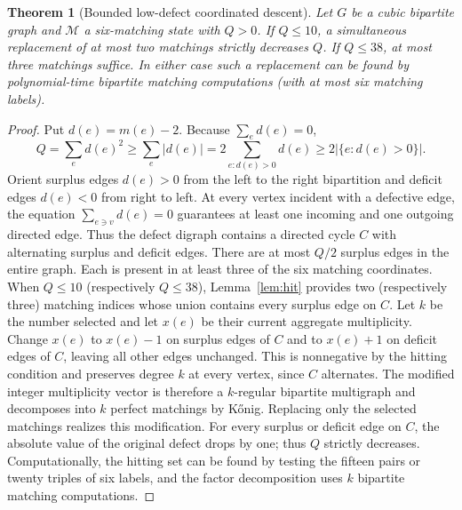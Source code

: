 \documentclass[11pt]{article}
\newtheorem{theorem}{Theorem}[section]
\begin{document}
\begin{theorem}[Bounded low-defect coordinated descent]\label{thm:range}
Let $G$ be a cubic bipartite graph and $\mathcal M$ a
six-matching state with $Q>0$. If $Q\le10$, a simultaneous
replacement of at most two matchings strictly decreases $Q$.
If $Q\le38$, at most three matchings suffice. In either case
such a replacement can be found by polynomial-time bipartite
matching computations (with at most six matching labels).
\end{theorem}
\begin{proof}
Put $d(e)=m(e)-2$. Because $\sum_e d(e)=0$,
\[
 Q=\sum_ed(e)^2\ge\sum_e|d(e)|
   =2\sum_{e:d(e)>0}d(e)
   \ge2|\{e:d(e)>0\}|.
\]
Orient surplus edges $d(e)>0$ from the left to the right
bipartition and deficit edges $d(e)<0$ from right to left.
At every vertex incident with a defective edge, the equation
$\sum_{e\ni v}d(e)=0$ guarantees at least one incoming
and one outgoing directed edge. Thus the defect digraph
contains a directed cycle $C$ with alternating surplus and
deficit edges. There are at most $Q/2$ surplus edges in the
entire graph. Each is present in at least three of the six
matching coordinates. When $Q\le10$ (respectively $Q\le38$),
Lemma~\ref{lem:hit} provides two (respectively three) matching
indices whose union contains every surplus edge on $C$.
Let $k$ be the number selected and let $x(e)$ be their current
aggregate multiplicity. Change $x(e)$ to $x(e)-1$ on surplus
edges of $C$ and to $x(e)+1$ on deficit edges of $C$, leaving
all other edges unchanged. This is nonnegative by the hitting
condition and preserves degree $k$ at every vertex, since
$C$ alternates. The modified integer multiplicity vector is
therefore a $k$-regular bipartite multigraph and decomposes
into $k$ perfect matchings by K\H onig. Replacing only the
selected matchings realizes this modification. For every
surplus or deficit edge on $C$, the absolute value of the
original defect drops by one; thus $Q$ strictly decreases.
Computationally, the hitting set can be found by testing the
fifteen pairs or twenty triples of six labels, and the factor
decomposition uses $k$ bipartite matching computations.
\end{proof}
\end{document}
